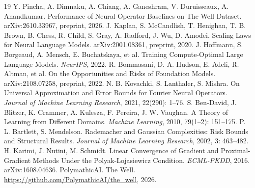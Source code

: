 \documentclass[preprint,12pt]{elsarticle}
\begin{document}
\begin{thebibliography}{19}
 Y. Pincha, A. Dimnaku, A. Chiang, A. Ganeshram, V. Duruisseaux, A. Anandkumar. Performance of Neural Operator Baselines on The Well Dataset. arXiv:2610.33967, preprint, 2026.
 J. Kaplan, S. McCandlish, T. Henighan, T. B. Brown, B. Chess, R. Child, S. Gray, A. Radford, J. Wu, D. Amodei. Scaling Laws for Neural Language Models. arXiv:2001.08361, preprint, 2020.
 J. Hoffmann, S. Borgeaud, A. Mensch, E. Buchatskaya, et al. Training Compute-Optimal Large Language Models. \emph{NeurIPS}, 2022.
 R. Bommasani, D. A. Hudson, E. Adeli, R. Altman, et al. On the Opportunities and Risks of Foundation Models. arXiv:2108.07258, preprint, 2022.
 N. B. Kovachki, S. Lanthaler, S. Mishra. On Universal Approximation and Error Bounds for Fourier Neural Operators. \emph{Journal of Machine Learning Research}, 2021, 22(290): 1--76.
 S. Ben-David, J. Blitzer, K. Crammer, A. Kulesza, F. Pereira, J. W. Vaughan. A Theory of Learning from Different Domains. \emph{Machine Learning}, 2010, 79(1--2): 151--175.
 P. L. Bartlett, S. Mendelson. Rademacher and Gaussian Complexities: Risk Bounds and Structural Results. \emph{Journal of Machine Learning Research}, 2002, 3: 463--482.
 H. Karimi, J. Nutini, M. Schmidt. Linear Convergence of Gradient and Proximal-Gradient Methods Under the Polyak-Lojasiewicz Condition. \emph{ECML-PKDD}, 2016. arXiv:1608.04636.
 PolymathicAI. The Well. \url{https://github.com/PolymathicAI/the_well}, 2026.
\end{thebibliography}
\end{document}
